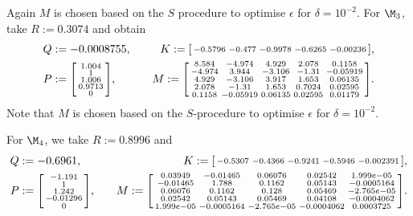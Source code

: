 \documentclass[letterpaper, 10 pt, conference]{amsart}
\theoremstyle{definition}
\theoremstyle{example}
\theoremstyle{remark}
\newcommand{\eps}{\epsilon}
\begin{document}
Again $M$ is chosen based on the $S$ procedure to optimise $\eps$ for $\delta=10^{-2}$.
For $\M_3$, take $R:= 0.3074$ and obtain 
\begin{align*}
Q& :=-0.0008755,&\quad 
K:=\begin{bsmallmatrix} -0.5796 &  -0.477 & -0.9978 & -0.6265 &-0.00236\end{bsmallmatrix}, \\
P&:= \begin{bsmallmatrix}     1.004 \\ 
       1 \\ 
   1.006 \\ 
  0.9713 \\ 
       0\end{bsmallmatrix}, &\quad 
M:=\begin{bsmallmatrix}    8.584 &  -4.974 &   4.929 &   2.078 &  0.1158 \\ 
  -4.974 &   3.944 &  -3.106 &   -1.31 &-0.05919 \\ 
   4.929 &  -3.106 &   3.917 &   1.653 & 0.06135 \\ 
   2.078 &   -1.31 &   1.653 &  0.7024 & 0.02595 \\ 
  0.1158 &-0.05919 & 0.06135 & 0.02595 & 0.01179  \end{bsmallmatrix}.
\end{align*}
Note that $M$ is chosen based on the $S$-procedure to optimise $\eps$ for $\delta=10^{-2}$.


\noindent For $\M_4$, we take  $R := 0.8996$ and 
\begin{align*}
Q& := -0.6961,&\quad K:=\begin{bsmallmatrix}   -0.5307 & -0.4366 & -0.9241 & -0.5946 &-0.002391\end{bsmallmatrix},\\
P&:= \begin{bsmallmatrix}    -1.191 \\ 
       1 \\ 
   1.242 \\ 
-0.01296 \\ 
       0 \end{bsmallmatrix},&\quad 
M:=\begin{bsmallmatrix}  0.03949 &-0.01465 & 0.06076 & 0.02542 &1.999e-05 \\ 
-0.01465 &   1.788 &  0.1162 & 0.05143 &-0.0005164 \\ 
 0.06076 &  0.1162 &   0.128 & 0.05469 &-2.765e-05 \\ 
 0.02542 & 0.05143 & 0.05469 & 0.04108 &-0.0004062 \\ 
1.999e-05 &-0.0005164 &-2.765e-05 &-0.0004062 &0.0003725 \end{bsmallmatrix}.
\end{align*}
\end{document}
